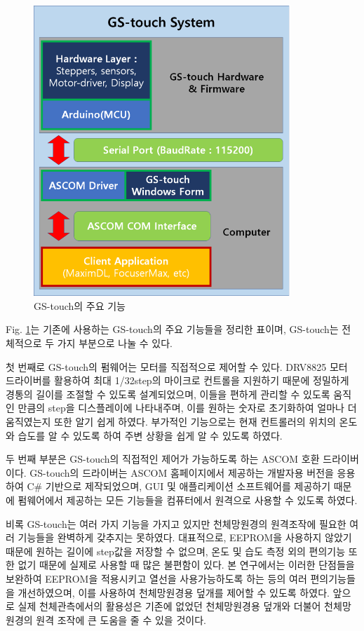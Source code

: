 \documentclass[twoside,11pt]{gshs_thesis}
\begin{document}
 \bigskip
 \begin{figure}[h]
 	\begin{center}
 		\includegraphics[width = 9.7cm]{GStouch}
 	\end{center}
 	\caption{GS-touch의 주요 기능}
 	\label{GStocuh}
 \end{figure}
  Fig. \ref{GStocuh}는 기존에 사용하는 GS-touch의 주요 기능들을 정리한 표이며, GS-touch는 전체적으로 두 가지 부분으로 나눌 수 있다.
  
첫 번째로 GS-touch의 펌웨어는 모터를 직접적으로 제어할 수 있다. DRV8825 모터 드라이버를 활용하여 최대 1/32step의 마이크로 컨트롤을 지원하기 때문에 정밀하게 경통의 길이를 조절할 수 있도록 설계되었으며, 이들을 편하게 관리할 수 있도록 움직인 만큼의 step을 디스플레이에 나타내주며, 이를 원하는 숫자로 초기화하여 얼마나 더 움직였는지 또한 알기 쉽게 하였다. 부가적인 기능으로는 현재 컨트롤러의 위치의 온도와 습도를 알 수 있도록 하여 주변 상황을 쉽게 알 수 있도록 하였다.

두 번째 부분은 GS-touch의 직접적인 제어가 가능하도록 하는 ASCOM 호환 드라이버이다. GS-touch의 드라이버는 ASCOM 홈페이지에서 제공하는 개발자용 버전을 응용하여 C\# 기반으로 제작되었으며, GUI 및 애플리케이션 소프트웨어를 제공하기 때문에 펌웨어에서 제공하는 모든 기능들을 컴퓨터에서 원격으로 사용할 수 있도록 하였다.


비록 GS-touch는 여러 가지 기능을 가지고 있지만 천체망원경의 원격조작에 필요한 여러 기능들을 완벽하게 갖추지는 못하였다. 대표적으로, EEPROM을 사용하지 않았기 때문에 원하는 길이에 step값을 저장할 수 없으며, 온도 및 습도 측정 외의 편의기능 또한 없기 때문에 실제로 사용할 때 많은 불편함이 있다. 본 연구에서는 이러한 단점들을 보완하여 EEPROM을 적용시키고 열선을 사용가능하도록 하는 등의 여러 편의기능들을 개선하였으며, 이를 사용하여 천체망원경용 덮개를 제어할 수 있도록 하였다. 앞으로 실제 천체관측에서의 활용성은 기존에 없었던 천체망원경용 덮개와 더불어 천체망원경의 원격 조작에 큰 도움을 줄 수 있을 것이다.
\end{document}
